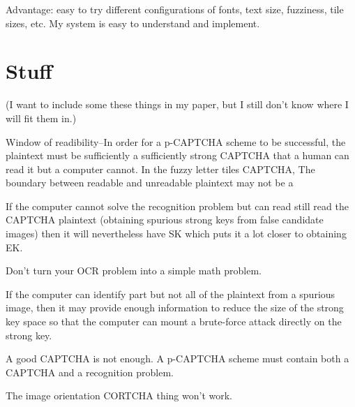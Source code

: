 \documentclass[12pt]{article}
\begin{document}
Advantage: easy to try different configurations of fonts, text size, fuzziness, tile sizes, etc.
My system is easy to understand and implement.

\section*{Stuff}
(I want to include some these things in my paper, but I still don't know where I will fit them in.)

Window of readibility--In order for a p-CAPTCHA scheme to be successful, the plaintext must be sufficiently a sufficiently strong CAPTCHA that a human can read it but a computer cannot. In the fuzzy letter tiles CAPTCHA,  The boundary between readable and unreadable plaintext may not be a 

If the computer cannot solve the recognition problem but can read still read the CAPTCHA plaintext (obtaining spurious strong keys from false candidate images) then it will nevertheless have SK which puts it a lot closer to obtaining EK.

Don't turn your OCR problem into a simple math problem.

If the computer can identify part but not all of the plaintext from a spurious image, then it may provide enough information to reduce the size of the strong key space so that the computer can mount a brute-force attack directly on the strong key. 

A good CAPTCHA is not enough. A p-CAPTCHA scheme must contain both a CAPTCHA and a recognition problem.

The image orientation CORTCHA thing won't work.
\end{document}
